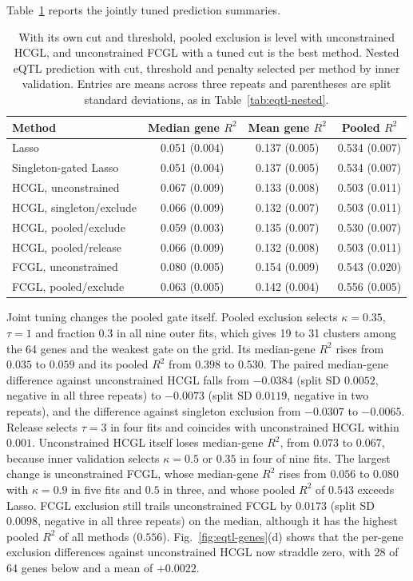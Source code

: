 \documentclass[lineno,pdflatex,sn-basic]{sn-jnl}
\theoremstyle{thmstyleone}
\begin{document}
Table~\ref{tab:eqtl-joint} reports the jointly tuned prediction summaries.

\begin{table}[htbp]\centering\small
\caption{With its own cut and threshold, pooled exclusion is level with
unconstrained HCGL, and unconstrained FCGL with a tuned cut is the best
method. Nested eQTL prediction with cut, threshold and penalty selected per
method by inner validation. Entries are means across three repeats and
parentheses are split standard deviations, as in Table~\ref{tab:eqtl-nested}.}
\label{tab:eqtl-joint}
\begin{tabular}{lccc}\toprule
Method & Median gene $R^2$ & Mean gene $R^2$ & Pooled $R^2$\\\midrule
Lasso & 0.051 (0.004) & 0.137 (0.005) & 0.534 (0.007) \\
Singleton-gated Lasso & 0.051 (0.004) & 0.137 (0.005) & 0.534 (0.007) \\
HCGL, unconstrained & 0.067 (0.009) & 0.133 (0.008) & 0.503 (0.011) \\
HCGL, singleton/exclude & 0.066 (0.009) & 0.132 (0.007) & 0.503 (0.011) \\
HCGL, pooled/exclude & 0.059 (0.003) & 0.135 (0.007) & 0.530 (0.007) \\
HCGL, pooled/release & 0.066 (0.009) & 0.132 (0.008) & 0.503 (0.011) \\
FCGL, unconstrained & 0.080 (0.005) & 0.154 (0.009) & 0.543 (0.020) \\
FCGL, pooled/exclude & 0.063 (0.005) & 0.142 (0.004) & 0.556 (0.005) \\
\bottomrule\end{tabular}
\end{table}

Joint tuning changes the pooled gate itself. Pooled exclusion selects
$\kappa=0.35$, $\tau=1$ and fraction $0.3$ in all nine outer fits, which gives
19 to 31 clusters among the 64 genes and the weakest gate on the grid. Its
median-gene $R^2$ rises from $0.035$ to $0.059$ and its pooled $R^2$ from
$0.398$ to $0.530$. The paired median-gene difference against unconstrained
HCGL falls from $-0.0384$ (split SD $0.0052$, negative in all three repeats)
to $-0.0073$ (split SD $0.0119$, negative in two repeats), and the difference
against singleton exclusion from $-0.0307$ to $-0.0065$. Release selects
$\tau=3$ in four fits and coincides with unconstrained HCGL within $0.001$.
Unconstrained HCGL itself loses median-gene $R^2$, from $0.073$ to $0.067$,
because inner validation selects $\kappa=0.5$ or $0.35$ in four of nine fits.
The largest change is unconstrained FCGL, whose median-gene $R^2$ rises from
$0.056$ to $0.080$ with $\kappa=0.9$ in five fits and $0.5$ in three, and
whose pooled $R^2$ of $0.543$ exceeds Lasso. FCGL exclusion still trails
unconstrained FCGL by $0.0173$ (split SD $0.0098$, negative in all three
repeats) on the median, although it has the highest pooled $R^2$ of all
methods ($0.556$). Fig.~\ref{fig:eqtl-genes}(d) shows that the per-gene
exclusion differences against unconstrained HCGL now straddle zero, with 28
of 64 genes below and a mean of $+0.0022$.
\end{document}
